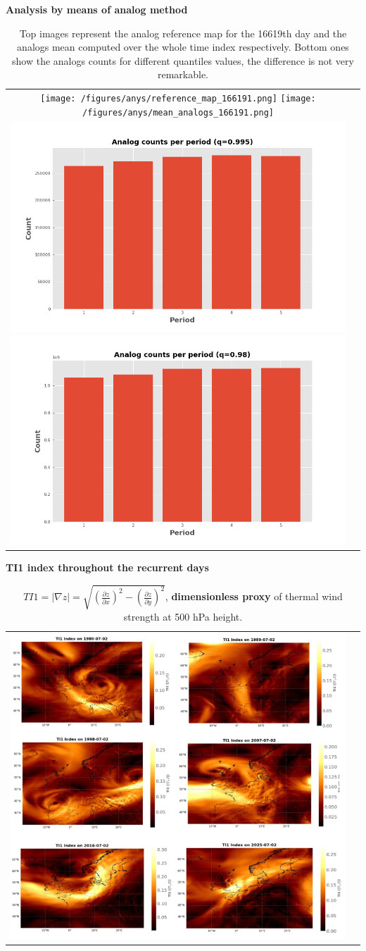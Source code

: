 \documentclass[9pt]{beamer}
\newcommand\Fontvs{\fontsize{4}{6.0}\selectfont}
\newcommand\Fontvi{\fontsize{6}{7.2}\selectfont}
\begin{document}
\begin{frame}[allowframebreaks]{\textbf{Analysis by means of analog method}}
\Fontvi
\begin{table}
    \centering
    \begin{tabular}{cc}
        \texttt{[image: /figures/anys/reference\_map\_166191.png]}  
        \texttt{[image: /figures/anys/mean\_analogs\_166191.png]} \\
         \includegraphics[width=0.31\linewidth]{figures/anys/ancountsper1_0.98_0.99_0.995_16619.png}
        \includegraphics[width=0.31\linewidth]{figures/anys/analogcounts1_0.981.png}
    \end{tabular}
        \caption{Top images represent the analog reference map for the 16619th day and the analogs mean computed over the whole time index respectively. Bottom ones show the analogs counts for different quantiles values, the difference is not very remarkable. }
    \label{fig:7}
\end{table}
\end{frame}

\begin{frame}[allowframebreaks]{\textbf{TI1 index throughout the recurrent days}}
\begin{table}
    \centering
    \begin{tabular}{cc}
        \includegraphics[height=0.56\textwidth]{figures/anys/tindexs.png} \\ 
    \end{tabular}
    \label{fig:9}
    \Fontvs
    \caption{$TI1= |\nabla z| = \sqrt{ \left(\frac{\partial z}{\partial x}\right)^2-\left(\frac{\partial z}{\partial y}\right)^2}$, \textbf{dimensionless proxy} of thermal wind strength at 500 hPa height.}
\end{table}
\end{frame}
\end{document}
